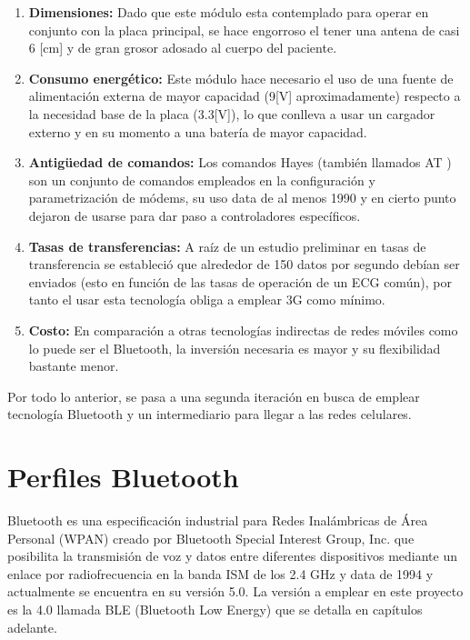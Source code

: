 \begin{enumerate}
	\item\textbf{Dimensiones:}
	Dado que este módulo esta contemplado para operar en conjunto con la placa principal, se hace engorroso el tener una antena de casi 6 [cm] y de gran grosor adosado al cuerpo del paciente.
	\item\textbf{Consumo energético:}
	Este módulo hace necesario el uso de una fuente de alimentación externa de mayor capacidad (9[V] aproximadamente) respecto a la necesidad base de la placa (3.3[V]), lo que conlleva a usar un cargador externo y en su momento a una batería de mayor capacidad.
	\item\textbf{Antigüedad de comandos:}
	Los comandos Hayes (también llamados AT \cite{AT}) son un conjunto de comandos empleados en la configuración y parametrización de módems, su uso data de al menos 1990 y en cierto punto dejaron de usarse para dar paso a controladores específicos. 
	\item\textbf{Tasas de transferencias:}
	A raíz de un estudio preliminar en tasas de transferencia se estableció que alrededor de 150 datos por segundo debían ser enviados (esto en función de las tasas de operación de un ECG común\cite{ecg_rate}), por tanto el usar esta tecnología obliga a emplear 3G como mínimo. 
	\item\textbf{Costo:}
	En comparación a otras tecnologías indirectas de redes móviles como lo puede ser el Bluetooth, la inversión necesaria es mayor y su flexibilidad bastante menor.
\end{enumerate}

Por todo lo anterior, se pasa a una segunda iteración en busca de emplear tecnología Bluetooth y un intermediario para llegar a las redes celulares.\\


\section{Perfiles Bluetooth}

Bluetooth \cite{bluetooth} es una especificación industrial para Redes Inalámbricas de Área Personal (WPAN) creado por Bluetooth Special Interest Group, Inc. que posibilita la transmisión de voz y datos entre diferentes dispositivos mediante un enlace por radiofrecuencia en la banda ISM de los 2.4 GHz y data de 1994 y actualmente se encuentra en su versión 5.0. La versión a emplear en este proyecto es la 4.0 llamada BLE (Bluetooth Low Energy) que se detalla en capítulos adelante. \\


